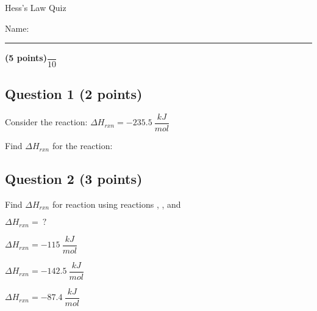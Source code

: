 \documentclass[12pt, letterpaper]{memoir}
\begin{document}
	\begin{center}
		{\large Hess's Law Quiz}
	\end{center}
	{\large Name: \rule[-1mm]{4in}{.1pt} {\bfseries (5 points)}\hspace{4em}$\dfrac{~}{10}$} 
	
	\subsection*{Question 1 (2 points)}
	Consider the reaction:  \hspace{1.5em} $\Delta H_{rxn} = -235.5~\dfrac{kJ}{mol}$
	
	\noindent
	Find $\Delta H_{rxn}$ for the reaction: 
	

	\vspace{6em}
	\subsection*{Question 2 (3 points)}
	Find $\Delta H_{rxn}$ for reaction \circled{$\star$} using reactions , , and 
	
	\circled{$\star$}  \hspace{1.5em} $\Delta H_{rxn} = ~?$
	
	  \hspace{1.5em} $\Delta H_{rxn} = -115~\dfrac{kJ}{mol}$
	
	  \hspace{1.5em} $\Delta H_{rxn} = -142.5~\dfrac{kJ}{mol}$
	
	  \hspace{1.5em} $\Delta H_{rxn} = -87.4~\dfrac{kJ}{mol}$
	
	
\end{document}
